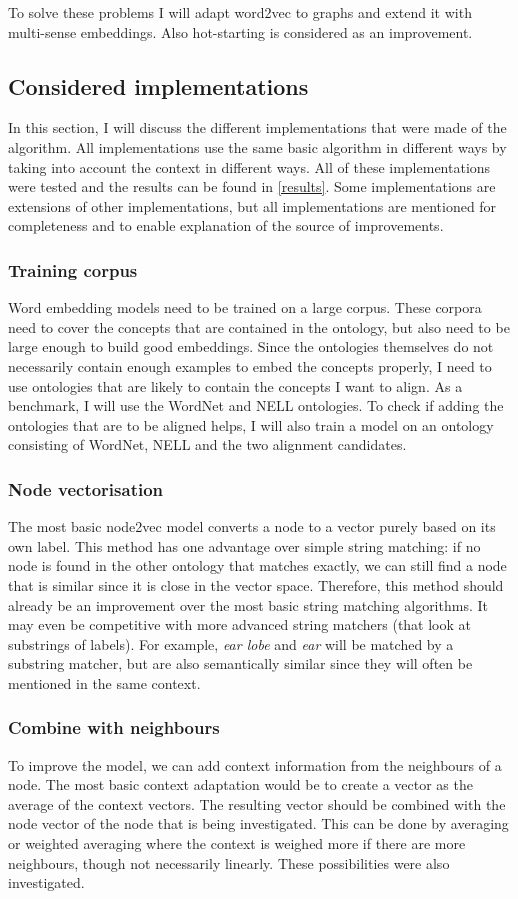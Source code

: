 \documentclass{article}
\begin{document}
 To solve these problems I will adapt word2vec to graphs and extend it with multi-sense embeddings. Also hot-starting is considered as an improvement.
 \subsection{Considered implementations}
 In this section, I will discuss the different implementations that were made of the algorithm. All implementations use the same basic algorithm in different ways by taking into account the context in different ways. All of these implementations were tested and the results can be found in \ref{results}. Some implementations are extensions of other implementations, but all implementations are mentioned for completeness and to enable explanation of the source of improvements.
  \subsubsection{Training corpus}
  Word embedding models need to be trained on a large corpus. These corpora need to cover the concepts that are contained in the ontology, but also need to be large enough to build good embeddings. Since the ontologies themselves do not necessarily contain enough examples to embed the concepts properly, I need to use ontologies that are likely to contain the concepts I want to align.
  As a benchmark, I will use the WordNet and NELL ontologies. To check if adding the ontologies that are to be aligned helps, I will also train a model on an ontology consisting of WordNet, NELL and the two alignment candidates.
  \subsubsection{Node vectorisation}
  The most basic node2vec model converts a node to a vector purely based on its own label. This method has one advantage over simple string matching: if no node is found in the other ontology that matches exactly, we can still find a node that is similar since it is close in the vector space. Therefore, this method should already be an improvement over the most basic string matching algorithms. It may even be competitive with more advanced string matchers (that look at substrings of labels). For example, \emph{ear lobe} and \emph{ear} will be matched by a substring matcher, but are also semantically similar since they will often be mentioned in the same context.
  \subsubsection{Combine with neighbours}
  To improve the model, we can add context information from the neighbours of a node. The most basic context adaptation would be to create a vector as the average of the context vectors. The resulting vector should be combined with the node vector of the node that is being investigated. This can be done by averaging or weighted averaging where the context is weighed more if there are more neighbours, though not necessarily linearly. These possibilities were also investigated.
\end{document}
